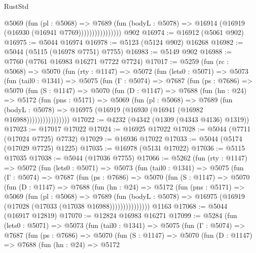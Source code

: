\begin{lexlean}{RustStd}
\begin{coremodule}
                        @5069
                          (fun (pl : @5068) =>
                          @7689
                            (fun (bodyL : @5078) =>
                            @16914 (@16919 (@16930 (@16941 @7769))))))))))))))))
    @902
@16974 := @16912 (@5061 @902)
@16975 := @5044 @16974
@16978 := @5123 (@5124 @902) @16268
@16982 := @5044 (@5115 (@16978 @7751) @7755)
@16983 := @5149 @902
@16988 := @7760 (@7761 @16983 @16271 @7722 @7724)
@17017 := @5259
    (fun (rc : @5068) =>
    @5070
      (fun (rty : @1147) =>
      @5072
        (fun (lets0 : @5071) =>
        @5073
          (fun (tail0 : @1341) =>
          @5075
            (fun (Γ : @5074) =>
            @7687
              (fun (ps : @7686) =>
              @5070
                (fun (S : @1147) =>
                @5070
                  (fun (D : @1147) =>
                  @7688
                    (fun (hn : @24) =>
                    @5172
                      (fun (pns : @5171) =>
                      @5069
                        (fun (pl : @5068) =>
                        @7689
                          (fun (bodyL : @5078) =>
                          @16975 (@16919 (@16930 (@16941 (@16982 @16988))))))))))))))))
@17022 := @4232 (@4342 (@1309 (@4343 @4136) @1319))
@17023 := @17017 @17022
@17024 := @16925 @17022
@17028 := @5044 (@7711 (@17024 @7725) @7732)
@17029 := @16936 @17022
@17033 := @5044 (@5174 (@17029 @7725) @1225)
@17035 := @16978 (@5131 @17022)
@17036 := @5115 @17035
@17038 := @5044 (@17036 @7755)
@17066 := @5262
    (fun (rty : @1147) =>
    @5072
      (fun (lets0 : @5071) =>
      @5073
        (fun (tail0 : @1341) =>
        @5075
          (fun (Γ : @5074) =>
          @7687
            (fun (ps : @7686) =>
            @5070
              (fun (S : @1147) =>
              @5070
                (fun (D : @1147) =>
                @7688
                  (fun (hn : @24) =>
                  @5172
                    (fun (pns : @5171) =>
                    @5069
                      (fun (pl : @5068) =>
                      @7689
                        (fun (bodyL : @5078) =>
                        @16975 (@16919 (@17028 (@17033 (@17038 @16988)))))))))))))))
    @1163
@17068 := @5044 (@16917 @12819)
@17070 := @12824 @16983 @16271
@17099 := @5284
    (fun (lets0 : @5071) =>
    @5073
      (fun (tail0 : @1341) =>
      @5075
        (fun (Γ : @5074) =>
        @7687
          (fun (ps : @7686) =>
          @5070
            (fun (S : @1147) =>
            @5070
              (fun (D : @1147) =>
              @7688
                (fun (hn : @24) =>
                @5172

\end{coremodule}
\end{lexlean}
